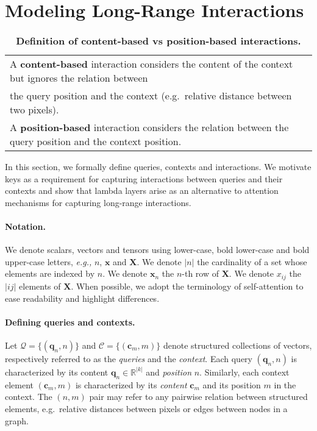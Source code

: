 \documentclass{article} \usepackage{iclr2021_conference,times}
\begin{document}
 \section{Modeling Long-Range Interactions\label{sec:preliminaries}}
\begin{table}[t]
  \begin{center}
  \small
  \begin{tabular}{l}
  \toprule
  A \textbf{content-based} interaction considers the content of the context but ignores the relation between \\
  the query position and the context (e.g.\ relative distance between two pixels). \\
  A \textbf{position-based} interaction considers the relation between the query position and the context position. \\
  \bottomrule
  \end{tabular}
  \caption{\textbf{Definition of content-based vs position-based interactions.}
  }
  \label{tab:content_position_interactions}
  \vspace{-0.4cm}
  \end{center}
\end{table}

In this section, we formally define queries, contexts and interactions.
We motivate keys as a requirement for capturing interactions between queries and their contexts and show that lambda layers arise as an alternative to attention mechanisms for capturing long-range interactions.

\vspace{-0.1cm}
\paragraph{Notation.} 
We denote scalars, vectors and tensors using lower-case, bold lower-case and bold upper-case letters, \textit{e.g.,} $n$, $\boldsymbol{x}$ and $\boldsymbol{X}$. 
We denote $|n|$ the cardinality of a set whose elements are indexed by $n$.
We denote $\boldsymbol{x}_n$ the $n$-th row of $\boldsymbol{X}$.
We denote $x_{ij}$ the $|ij|$ elements of $\boldsymbol{X}$.
When possible, we adopt the terminology of self-attention to ease readability and highlight differences.

\vspace{-0.1cm}
\paragraph{Defining queries and contexts.}
Let $\mathcal{Q}=\{(\boldsymbol{q}_n, n)\}$ and $\mathcal{C}=\{(\boldsymbol{c}_m, m)\}$ denote structured collections of vectors, respectively referred to as the \emph{queries} and the \emph{context}.
Each query $(\boldsymbol{q}_n, n)$ is characterized by its content $\boldsymbol{q}_n \in \mathbb{R}^{|k|}$ and \emph{position} $n$.
Similarly, each context element $(\boldsymbol{c}_m, m)$ is characterized by its \emph{content} $\boldsymbol{c}_m$ 
and its position $m$ in the context.
The $(n, m)$ pair may refer to any pairwise relation between structured elements, e.g.\ relative distances between pixels or edges between nodes in a graph.
\end{document}
